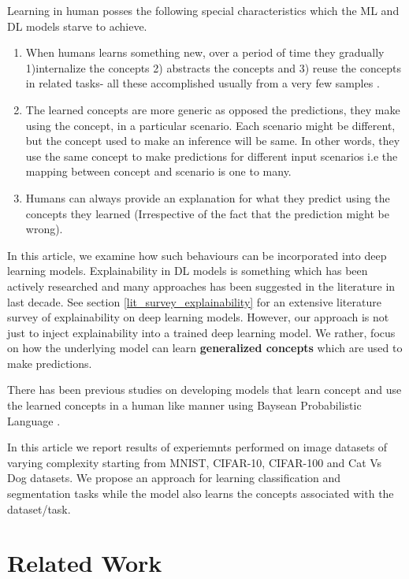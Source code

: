 \documentclass{JMLFS}
\begin{document}
Learning in human posses the following special characteristics which the ML and DL models starve to achieve.
\begin{enumerate}

\item When humans learns something new, over a period of time they gradually  1)internalize the concepts 2) abstracts the concepts and 3) reuse the concepts in related tasks- all these accomplished usually from a very few samples \cite{lake2015}.

\item The learned concepts are more generic as opposed the predictions, they make using the concept, in a particular scenario.
Each scenario might be different, but the concept used to make an inference will be same.
In other words, they use the same concept to make predictions for different input scenarios i.e the mapping between concept and scenario is one to many.

\item Humans can always provide an explanation for what they predict using the concepts they learned (Irrespective of the fact that the prediction might be wrong).

\end{enumerate}
In this article, we examine how such behaviours can be incorporated into deep learning models.
Explainability in DL models is something which has been actively researched and many approaches has been suggested in the literature in last decade\cite{}.
See section \ref{lit_survey_explainability} for an extensive literature survey of explainability on deep learning models.
However, our approach is not just to inject explainability into a trained deep learning model.
We rather, focus on how the underlying model can learn \textbf{generalized concepts}  which are used to make predictions.


There has been previous studies \cite{mr01} on developing models that learn concept and use the learned concepts in a human like manner using Baysean Probabilistic Language \cite{}.

In this article we report results of experiemnts performed on image datasets of varying complexity starting from MNIST, CIFAR-10, CIFAR-100 and Cat Vs Dog datasets.
We propose an approach for learning classification and segmentation tasks while the model also learns the concepts associated with the dataset/task.

\section{Related Work}
\end{document}
